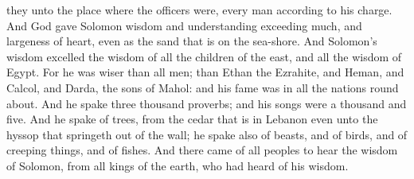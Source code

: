 they unto the place where the officers were, every man according to his charge.  And God gave Solomon wisdom and understanding exceeding much, and largeness of heart, even as the sand that is on the sea-shore. And Solomon’s wisdom excelled the wisdom of all the children of the east, and all the wisdom of Egypt. For he was wiser than all men; than Ethan the Ezrahite, and Heman, and Calcol, and Darda, the sons of Mahol: and his fame was in all the nations round about. And he spake three thousand proverbs; and his songs were a thousand and five. And he spake of trees, from the cedar that is in Lebanon even unto the hyssop that springeth out of the wall; he spake also of beasts, and of birds, and of creeping things, and of fishes. And there came of all peoples to hear the wisdom of Solomon, from all kings of the earth, who had heard of his wisdom. 

